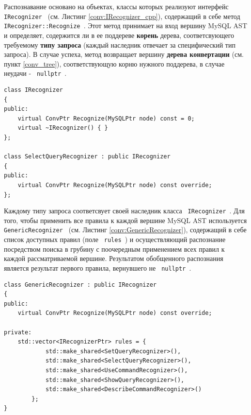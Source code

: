 Распознавание основано на объектах, классы которых реализуют интерфейс \texttt{ IRecognizer } (см. Листинг \ref{conv:IRecognizer_cpp}), содержащий в себе метод \texttt{ IRecognizer::Recognize }. Этот метод принимает на вход вершину MySQL AST и определяет, содержится ли в ее поддереве \textbf{корень} дерева, соответсвующего требуемому \textbf{типу запроса} (каждый наследник отвечает за специфический тип запроса). В случае успеха, метод возвращает вершину \textbf{дерева конвертации} (см. пункт \ref{conv_tree}), соответствующую корню нужного поддерева, в случае неудачи - \texttt{ nullptr }.

\begin{code}
    \label{conv:IRecognizer_cpp}
    \begin{verbatim}
class IRecognizer
{
public:
    virtual ConvPtr Recognize(MySQLPtr node) const = 0;
    virtual ~IRecognizer() { }
};

class SelectQueryRecognizer : public IRecognizer
{
public:
    virtual ConvPtr Recognize(MySQLPtr node) const override;
};
    \end{verbatim}
\end{code}

Каждому типу запроса соответсвует своей наследник класса \texttt{ IRecognizer }. Для того, чтобы применить все правила к каждой вершине MySQL AST используется \texttt{ GenericRecognizer } (см. Листинг \ref{conv:GenericRecognizer}), содержащий в себе список доступных правил (поле \texttt{ rules }) и осуществляющий распознание посредством поиска в грубину с поочередным применением всех правил к каждой рассматриваемой вершине. Результатом обобщенного распознания является результат первого правила, вернувшего не \texttt{ nullptr }. 

\begin{code}
    \label{conv:GenericRecognizer}
    \begin{verbatim}
class GenericRecognizer : public IRecognizer
{
public:
    virtual ConvPtr Recognize(MySQLPtr node) const override;

private:
    std::vector<IRecognizerPtr> rules = {
            std::make_shared<SetQueryRecognizer>(),
            std::make_shared<SelectQueryRecognizer>(),
            std::make_shared<UseCommandRecognizer>(),
            std::make_shared<ShowQueryRecognizer>(),
            std::make_shared<DescribeCommandRecognizer>()
        };
}
    \end{verbatim}
\end{code}

